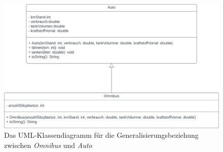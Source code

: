 \begin{figure}
    \begin{center}
    \includegraphics[scale=0.3]{chapters/2. Vererbung/img/omniuml}
    \caption{Das UML-Klassendiagramm für die Generalisierungsbeziehung zwischen \textit{Omnibus} und \textit{Auto}}
    \label{fig:omniuml}
    \end{center}
\end{figure}
